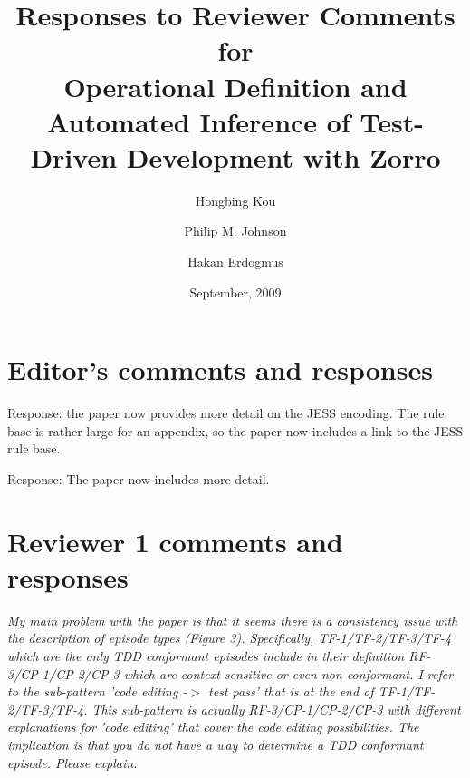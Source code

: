\documentclass[11pt]{article}
\begin{document}
\title{Responses to Reviewer Comments for \\
Operational Definition and Automated Inference of Test-Driven Development with Zorro}
\author{Hongbing Kou \and Philip M. Johnson \and Hakan Erdogmus}
\date{September, 2009}

\maketitle

\section{Editor's comments and responses}



\noindent Response: the paper now provides more detail on the JESS encoding.   The rule base is rather large for an appendix, so the paper now includes a link to the JESS rule base. 


\noindent Response: The paper now includes more detail. 


\section{Reviewer 1 comments and responses}


{\noindent \em My main problem with the paper is that it seems there is a consistency issue with the description of episode types (Figure 3). Specifically, TF-1/TF-2/TF-3/TF-4 which are the only TDD conformant episodes include in their definition RF-3/CP-1/CP-2/CP-3 which are context sensitive or even non conformant.  I refer to the sub-pattern 'code editing -$>$ test pass' that is at the end of TF-1/TF-2/TF-3/TF-4. This sub-pattern is actually RF-3/CP-1/CP-2/CP-3 with different explanations for 'code editing' that cover the code editing possibilities. The implication is that you do not have a way to determine a TDD conformant episode. Please explain.}
\end{document}
